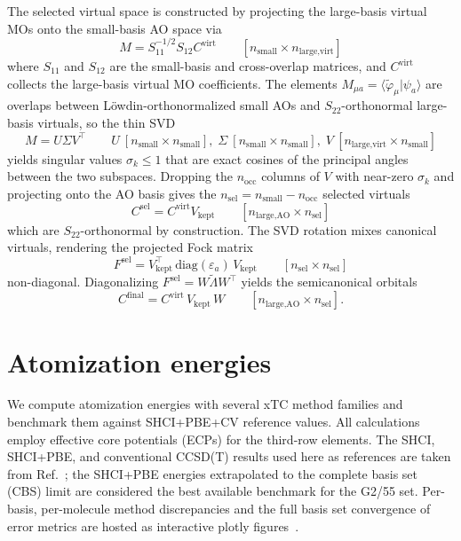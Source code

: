 \documentclass[12pt]{article}
\begin{document}
The selected virtual space is constructed by projecting the large-basis virtual
MOs onto the small-basis AO space via
%
\begin{equation}
  M = S_{11}^{-1/2} S_{12} C^{\text{virt}}
  \qquad [n_{\text{small}} \times n_{\text{large,virt}}]
\end{equation}
%
where $S_{11}$ and $S_{12}$ are the small-basis and cross-overlap matrices,
and $C^{\text{virt}}$ collects the large-basis virtual MO coefficients.
The elements $M_{\mu a} = \langle\tilde\varphi_\mu|\psi_a\rangle$ are overlaps
between L\"{o}wdin-orthonormalized small AOs and $S_{22}$-orthonormal
large-basis virtuals, so the thin SVD
%
\begin{equation}
  M = U\Sigma V^{\top}
  \qquad
  U\ [n_{\text{small}}\times n_{\text{small}}],\;
  \Sigma\ [n_{\text{small}}\times n_{\text{small}}],\;
  V\ [n_{\text{large,virt}}\times n_{\text{small}}]
\end{equation}
%
yields singular values $\sigma_k\leq 1$ that are exact cosines of the principal
angles between the two subspaces. Dropping the $n_{\text{occ}}$ columns of $V$
with near-zero $\sigma_k$ and projecting onto the AO basis gives the
$n_{\text{sel}}=n_{\text{small}}-n_{\text{occ}}$ selected virtuals
%
\begin{equation}
  C^{\text{sel}} = C^{\text{virt}} V_{\text{kept}}
  \qquad [n_{\text{large,AO}}\times n_{\text{sel}}]
\end{equation}
%
which are $S_{22}$-orthonormal by construction. The SVD rotation mixes
canonical virtuals, rendering the projected Fock matrix
%
\begin{equation}
  F^{\text{sel}} = V_{\text{kept}}^{\top}\,\mathrm{diag}(\varepsilon_a)\,V_{\text{kept}}
  \qquad [n_{\text{sel}}\times n_{\text{sel}}]
\end{equation}
%
non-diagonal. Diagonalizing $F^{\text{sel}} = W\tilde\Lambda W^{\top}$ yields
the semicanonical orbitals
%
\begin{equation}
  C^{\text{final}} = C^{\text{virt}}\,V_{\text{kept}}\,W
  \qquad [n_{\text{large,AO}}\times n_{\text{sel}}].
\end{equation}

\section{Atomization energies}

We compute atomization energies with several xTC method families and benchmark
them against SHCI+PBE+CV reference values. All calculations employ
effective core potentials (ECPs) for the third-row elements.
The SHCI, SHCI+PBE, and conventional CCSD(T) results used here as references
are taken from Ref.~\cite{Yao2020}; the SHCI+PBE energies extrapolated to the
complete basis set (CBS) limit are considered the best available benchmark
for the G2/55 set.
Per-basis, per-molecule method discrepancies and the full basis set convergence
of error metrics are hosted as interactive plotly figures~\cite{interactivefigs}.
\end{document}
